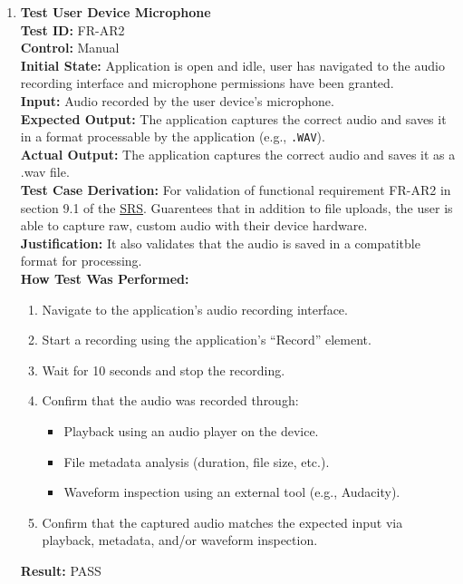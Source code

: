 \documentclass[12pt, titlepage]{article}
\begin{document}
\begin{enumerate}
  \item \textbf{Test User Device Microphone} \\
  \newline
  \textbf{Test ID:} FR-AR2 \\
  \textbf{Control:} Manual \\
  \textbf{Initial State:} Application is open and idle, user has navigated to the audio recording interface and microphone 
  permissions have been granted. \\
  \textbf{Input:} Audio recorded by the user device’s microphone. \\
  \textbf{Expected Output:} The application captures the correct audio and saves it in a format processable by the application 
  (e.g., \texttt{.WAV}). \\
  \textbf{Actual Output:} The application captures the correct audio and saves it as a .wav file. \\
  \textbf{Test Case Derivation:} For validation of functional requirement FR-AR2 in section 9.1 of the 
  \href{https://github.com/emilyperica/ScoreGen/blob/main/docs/SRS-Volere/SRS.pdf}{SRS}. Guarentees that in addition to file uploads, 
  the user is able to capture raw, custom audio with their device hardware. \\
  \textbf{Justification:} It also validates that the audio is saved in a compatitble format for processing.\\
  \textbf{How Test Was Performed:}
  \begin{enumerate}
      \item Navigate to the application’s audio recording interface.
      \item Start a recording using the application’s “Record” element.
      \item Wait for 10 seconds and stop the recording.
      \item Confirm that the audio was recorded through:
      \begin{itemize}
          \item Playback using an audio player on the device.
          \item File metadata analysis (duration, file size, etc.).
          \item Waveform inspection using an external tool (e.g., Audacity).
      \end{itemize}
      \item Confirm that the captured audio matches the expected input via playback, metadata, and/or waveform inspection.
  \end{enumerate}
  \textbf{Result:} PASS
  

\end{enumerate}
\end{document}
